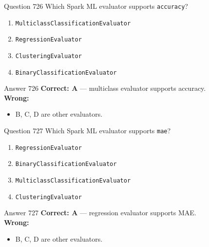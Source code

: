 \documentclass[aspectratio=169,11pt]{beamer}
\begin{document}
	\begin{frame}{Question 726}
		Which Spark ML evaluator supports \texttt{accuracy}?
		\begin{enumerate}[label=\Alph*.]
			\item \texttt{MulticlassClassificationEvaluator}
			\item \texttt{RegressionEvaluator}
			\item \texttt{ClusteringEvaluator}
			\item \texttt{BinaryClassificationEvaluator}
		\end{enumerate}
	\end{frame}
	\begin{frame}{Answer 726}
		\textbf{Correct: A} --- multiclass evaluator supports accuracy.\\
		\vspace{0.5em}
		\textbf{Wrong:}
		\begin{itemize}
			\item B, C, D are other evaluators.
		\end{itemize}
	\end{frame}
	
	\begin{frame}{Question 727}
		Which Spark ML evaluator supports \texttt{mae}?
		\begin{enumerate}[label=\Alph*.]
			\item \texttt{RegressionEvaluator}
			\item \texttt{BinaryClassificationEvaluator}
			\item \texttt{MulticlassClassificationEvaluator}
			\item \texttt{ClusteringEvaluator}
		\end{enumerate}
	\end{frame}
	\begin{frame}{Answer 727}
		\textbf{Correct: A} --- regression evaluator supports MAE.\\
		\vspace{0.5em}
		\textbf{Wrong:}
		\begin{itemize}
			\item B, C, D are other evaluators.
		\end{itemize}
	\end{frame}
	
\end{document}
